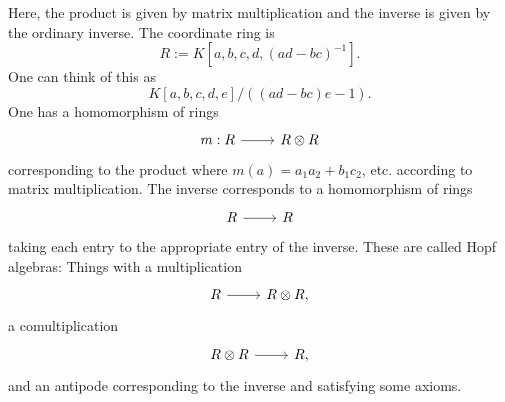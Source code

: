 \documentclass [11 pt, oneside] {article}
\begin{document}
\begin{example}[$\GL_2(K)$]\label{}
Here, the product is given by matrix multiplication and the inverse is given by the ordinary inverse. The coordinate ring is 
\[
	R:=K[a,b,c,d,(ad-bc) ^{-1}].
\] 
One can think of this as 
\[
	{K[a,b,c,d,e]}/{((ad-bc)e-1)}.
\] 
One has a homomorphism of rings 
\[
\begin{tikzcd}
m:R\ar[r]& R\tensor R
\end{tikzcd}
\]
corresponding to the product where $m(a)= a_1a_2+b_1c_2$, etc. according to matrix multiplication. The inverse corresponds to a homomorphism of rings 
\[
\begin{tikzcd}
R\ar[r]&R
\end{tikzcd}
\] 
taking each entry to the appropriate entry of the inverse. These are called {Hopf algebras}: Things with a multiplication 
\[
\begin{tikzcd}
R \ar[r]&  R\tensor R,
\end{tikzcd}
\]
a comultiplication 
\[
\begin{tikzcd}
R\tensor R\ar[r]& R,
\end{tikzcd}
\]
and an antipode corresponding to the inverse and satisfying some axioms.
\end{example}
\end{document}
